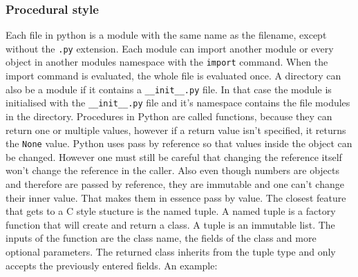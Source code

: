 \subsubsection{Procedural style}
Each file in python is a module with the same name as the filename, except without the \texttt{.py} extension. Each module can import another module or every object in another modules namespace with the \texttt{import} command. When the import command is evaluated, the whole file is evaluated once. A directory can also be a module if it contains a \texttt{\_\_init\_\_.py} file. In that case the module is initialised with the \texttt{\_\_init\_\_.py} file and it's namespace contains the file modules in the directory.
Procedures in Python are called functions, because they can return one or multiple values, however if a return value isn't specified, it returns the \texttt{None} value. Python uses pass by reference so that values inside the object can be changed. However one must still be careful that changing the reference itself won't change the reference in the caller. Also even though numbers are objects and therefore are passed by reference, they are immutable and one can't change their inner value. That makes them in essence pass by value.
The closest feature that gets to a C style stucture is the named tuple. A named tuple is a factory function that will create and return a class. A tuple is an immutable list. The inputs of the function are the class name, the fields of the class and more optional parameters. The returned class inherits from the tuple type and only accepts the previously entered fields. An example:

